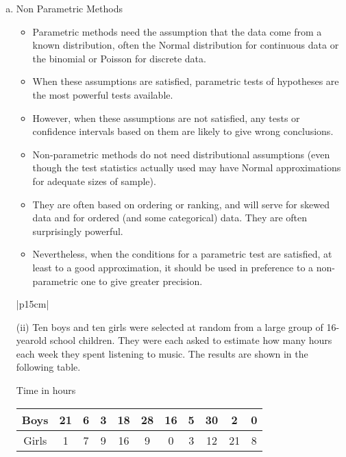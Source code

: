 \documentclass[a4paper,12pt]{article}
\begin{document}
\begin{enumerate}[(a)]
\item Non Parametric Methods 

\begin{itemize}
    \item Parametric methods need the assumption that the data come from a known
distribution, often the Normal distribution for continuous data or the binomial or
Poisson for discrete data.
\item When these assumptions are satisfied, parametric tests of
hypotheses are the most powerful tests available.
\item However, when these assumptions
are not satisfied, any tests or confidence intervals based on them are likely to give
wrong conclusions.
\item Non-parametric methods do not need distributional assumptions (even though the test
statistics actually used may have Normal approximations for adequate sizes of
sample). 
\item They are often based on ordering or ranking, and will serve for skewed data
and for ordered (and some categorical) data. They are often surprisingly powerful.
\item Nevertheless, when the conditions for a parametric test are satisfied, at least to a good
approximation, it should be used in preference to a non-parametric one to give greater
precision.
\end{itemize}

\newpage
 
\begin{table}[ht!]
 
\centering
 
\begin{tabular}{|p{15cm}|}
 
\hline  

 (ii) Ten boys and ten girls were selected at random from a large group of 16-yearold school children.  They were each asked to estimate how many hours each week they spent listening to music.  The results are shown in the following table. 
 
 Time in hours 
\begin{center}
\begin{tabular}{|c|cccccccccc|}
Boys & 21 & 6 & 3 & 18 & 28 & 16 & 5 & 30 &   2 & 0 \\ \hline 
Girls &   1 &  7 & 9 & 16 &   9 &   0 &  3 & 12&  21&  8\\  \hline 
\end{tabular}
\end{center} 
 

\end{tabular}
\end{table}
\end{enumerate}
\end{document}
